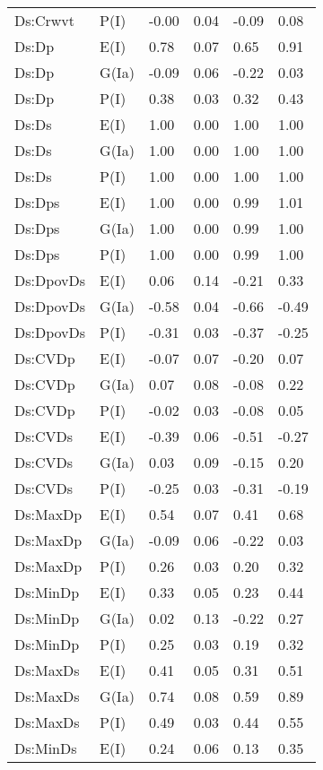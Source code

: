 \begin{center}
\begin{longtable}{|p{1.1in}|p{0.7in}|p{0.7in}|p{0.6in}|p{0.6in}|p{0.6in}|}
  Ds:Crwvt & P(I) & -0.00 & 0.04 & -0.09 & 0.08 \\ 
  Ds:Dp & E(I) & 0.78 & 0.07 & 0.65 & 0.91 \\ 
  Ds:Dp & G(Ia) & -0.09 & 0.06 & -0.22 & 0.03 \\ 
  Ds:Dp & P(I) & 0.38 & 0.03 & 0.32 & 0.43 \\ 
  Ds:Ds & E(I) & 1.00 & 0.00 & 1.00 & 1.00 \\ 
  Ds:Ds & G(Ia) & 1.00 & 0.00 & 1.00 & 1.00 \\ 
  Ds:Ds & P(I) & 1.00 & 0.00 & 1.00 & 1.00 \\ 
  Ds:Dps & E(I) & 1.00 & 0.00 & 0.99 & 1.01 \\ 
  Ds:Dps & G(Ia) & 1.00 & 0.00 & 0.99 & 1.00 \\ 
  Ds:Dps & P(I) & 1.00 & 0.00 & 0.99 & 1.00 \\ 
  Ds:DpovDs & E(I) & 0.06 & 0.14 & -0.21 & 0.33 \\ 
  Ds:DpovDs & G(Ia) & -0.58 & 0.04 & -0.66 & -0.49 \\ 
  Ds:DpovDs & P(I) & -0.31 & 0.03 & -0.37 & -0.25 \\ 
  Ds:CVDp & E(I) & -0.07 & 0.07 & -0.20 & 0.07 \\ 
  Ds:CVDp & G(Ia) & 0.07 & 0.08 & -0.08 & 0.22 \\ 
  Ds:CVDp & P(I) & -0.02 & 0.03 & -0.08 & 0.05 \\ 
  Ds:CVDs & E(I) & -0.39 & 0.06 & -0.51 & -0.27 \\ 
  Ds:CVDs & G(Ia) & 0.03 & 0.09 & -0.15 & 0.20 \\ 
  Ds:CVDs & P(I) & -0.25 & 0.03 & -0.31 & -0.19 \\ 
  Ds:MaxDp & E(I) & 0.54 & 0.07 & 0.41 & 0.68 \\ 
  Ds:MaxDp & G(Ia) & -0.09 & 0.06 & -0.22 & 0.03 \\ 
  Ds:MaxDp & P(I) & 0.26 & 0.03 & 0.20 & 0.32 \\ 
  Ds:MinDp & E(I) & 0.33 & 0.05 & 0.23 & 0.44 \\ 
  Ds:MinDp & G(Ia) & 0.02 & 0.13 & -0.22 & 0.27 \\ 
  Ds:MinDp & P(I) & 0.25 & 0.03 & 0.19 & 0.32 \\ 
  Ds:MaxDs & E(I) & 0.41 & 0.05 & 0.31 & 0.51 \\ 
  Ds:MaxDs & G(Ia) & 0.74 & 0.08 & 0.59 & 0.89 \\ 
  Ds:MaxDs & P(I) & 0.49 & 0.03 & 0.44 & 0.55 \\ 
  Ds:MinDs & E(I) & 0.24 & 0.06 & 0.13 & 0.35 \\ 

\end{longtable}
\end{center}
